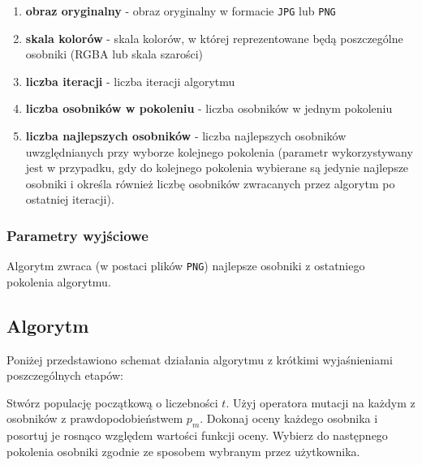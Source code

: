 \begin{enumerate}
    \item \textbf{obraz oryginalny} - obraz oryginalny w formacie \texttt{JPG} lub \texttt{PNG}
    \item \textbf{skala kolorów} - skala kolorów, w której reprezentowane będą poszczególne osobniki (RGBA lub skala szarości)
    \item \textbf{liczba iteracji} - liczba iteracji algorytmu
    \item \textbf{liczba osobników w pokoleniu} - liczba osobników w jednym pokoleniu
    \item \textbf{liczba najlepszych osobników} - liczba najlepszych osobników uwzględnianych przy wyborze kolejnego pokolenia (parametr wykorzystywany jest w przypadku, gdy do kolejnego pokolenia wybierane są jedynie najlepsze osobniki i określa również liczbę osobników zwracanych przez algorytm po ostatniej iteracji).
\end{enumerate}

\subsubsection{Parametry wyjściowe}

Algorytm zwraca (w postaci plików \texttt{PNG}) najlepsze osobniki z ostatniego pokolenia algorytmu.

\subsection{Algorytm}
Poniżej przedstawiono schemat działania algorytmu z krótkimi wyjaśnieniami poszczególnych etapów:

\begin{algorithm}
    \begin{algorithmic}[1]
        \State Stwórz populację początkową o liczebności $t$.
        \State Użyj operatora mutacji na każdym z osobników z prawdopodobieństwem $p_{m}$.
        \State Dokonaj oceny każdego osobnika i posortuj je rosnąco względem wartości funkcji oceny.
        \State Wybierz do następnego pokolenia osobniki zgodnie ze sposobem wybranym przez użytkownika.
    \end{algorithmic}
\end{algorithm}